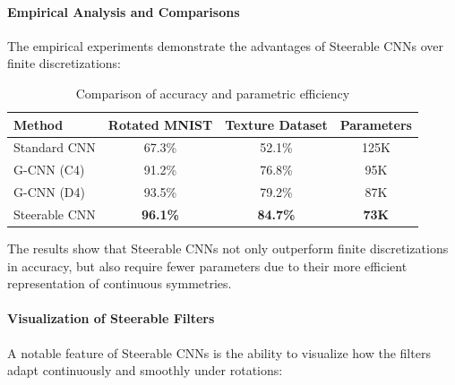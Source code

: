 \paragraph{Empirical Analysis and Comparisons}

The empirical experiments demonstrate the advantages of Steerable CNNs over finite discretizations:

\begin{table}[h]
\centering
\begin{tabular}{|l|c|c|c|}
\hline
\textbf{Method} & \textbf{Rotated MNIST} & \textbf{Texture Dataset} & \textbf{Parameters} \\
\hline
Standard CNN & 67.3\% & 52.1\% & 125K \\
G-CNN (C4) & 91.2\% & 76.8\% & 95K \\
G-CNN (D4) & 93.5\% & 79.2\% & 87K \\
Steerable CNN & \textbf{96.1\%} & \textbf{84.7\%} & \textbf{73K} \\
\hline
\end{tabular}
\caption{Comparison of accuracy and parametric efficiency}
\label{tab:steerable_comparison}
\end{table}

The results show that Steerable CNNs not only outperform finite discretizations in accuracy, but also require fewer parameters due to their more efficient representation of continuous symmetries.

\paragraph{Visualization of Steerable Filters}

A notable feature of Steerable CNNs is the ability to visualize how the filters adapt continuously and smoothly under rotations:

